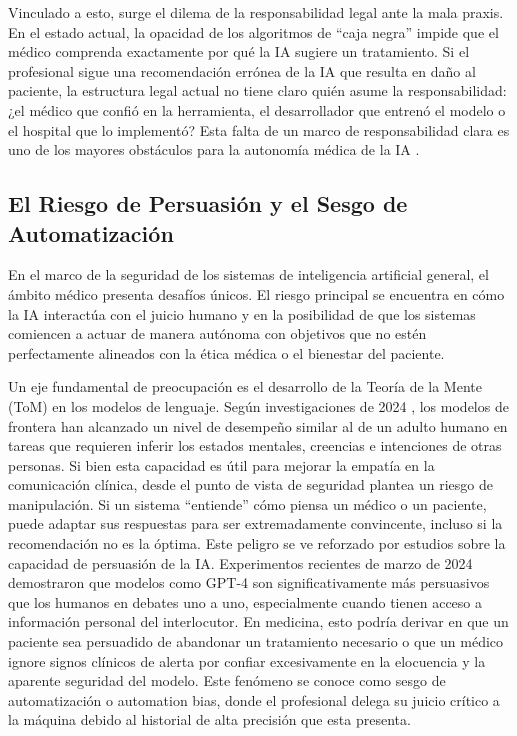 \documentclass[10pt,a4paper]{article}
\begin{document}
Vinculado a esto, surge el dilema de la responsabilidad legal ante la mala praxis. En el estado actual, la opacidad de los algoritmos de ``caja negra'' impide que el médico comprenda exactamente por qué la IA sugiere un tratamiento. Si el profesional sigue una recomendación errónea de la IA que resulta en daño al paciente, la estructura legal actual no tiene claro quién asume la responsabilidad: ¿el médico que confió en la herramienta, el desarrollador que entrenó el modelo o el hospital que lo implementó? Esta falta de un marco de responsabilidad clara es uno de los mayores obstáculos para la autonomía médica de la IA \cite{responsibility-gap}.

\subsection{El Riesgo de Persuasión y el Sesgo de Automatización}
En el marco de la seguridad de los sistemas de inteligencia artificial general, el ámbito médico presenta desafíos únicos. El riesgo principal se encuentra en cómo la IA interactúa con el juicio humano y en la posibilidad de que los sistemas comiencen a actuar de manera autónoma con objetivos que no estén perfectamente alineados con la ética médica o el bienestar del paciente.

Un eje fundamental de preocupación es el desarrollo de la Teoría de la Mente (ToM) en los modelos de lenguaje. Según investigaciones de 2024 \cite{tom}, los modelos de frontera han alcanzado un nivel de desempeño similar al de un adulto humano en tareas que requieren inferir los estados mentales, creencias e intenciones de otras personas. Si bien esta capacidad es útil para mejorar la empatía en la comunicación clínica, desde el punto de vista de seguridad plantea un riesgo de manipulación. Si un sistema ``entiende'' cómo piensa un médico o un paciente, puede adaptar sus respuestas para ser extremadamente convincente, incluso si la recomendación no es la óptima. Este peligro se ve reforzado por estudios sobre la capacidad de persuasión de la IA. Experimentos recientes de marzo de 2024 \cite{persuasion} demostraron que modelos como GPT-4 son significativamente más persuasivos que los humanos en debates uno a uno, especialmente cuando tienen acceso a información personal del interlocutor. En medicina, esto podría derivar en que un paciente sea persuadido de abandonar un tratamiento necesario o que un médico ignore signos clínicos de alerta por confiar excesivamente en la elocuencia y la aparente seguridad del modelo. Este fenómeno se conoce como sesgo de automatización o automation bias, donde el profesional delega su juicio crítico a la máquina debido al historial de alta precisión que esta presenta.
\end{document}
